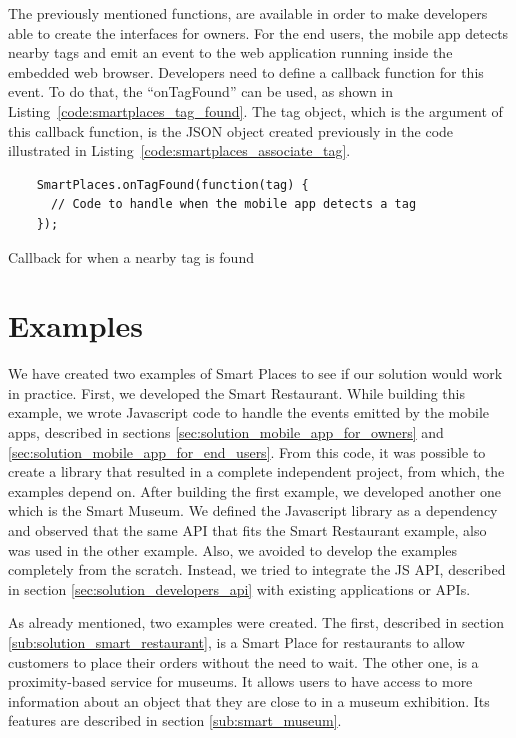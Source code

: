 The previously mentioned functions, are available in order to make developers able to create the interfaces for owners.
For the end users, the mobile app detects nearby tags and emit an event to the web application running inside the embedded web browser.
Developers need to define a callback function for this event.
To do that, the ``onTagFound'' can be used, as shown in Listing~\ref{code:smartplaces_tag_found}.
The tag object, which is the argument of this callback function, is the \gls{JSON} object created previously in the code illustrated in Listing~\ref{code:smartplaces_associate_tag}.

\begin{listing}[H]
  \begin{verbatim}
    SmartPlaces.onTagFound(function(tag) {
      // Code to handle when the mobile app detects a tag
    });
  \end{verbatim}
  \caption[Defining a callback for when a tag is found]{Callback for when a nearby tag is found}
  \label{code:smartplaces_tag_found}
\end{listing}

\section{Examples}
\label{sec:solution_examples}
We have created two examples of Smart Places to see if our solution would work in practice.
First, we developed the Smart Restaurant.
While building this example, we wrote Javascript code to handle the events emitted by the mobile apps, described in sections \ref{sec:solution_mobile_app_for_owners} and \ref{sec:solution_mobile_app_for_end_users}.
From this code, it was possible to create a library that resulted in a complete independent project, from which, the examples depend on.
After building the first example, we developed another one which is the Smart Museum.
We defined the Javascript library as a dependency and observed that the same \gls{API} that fits the Smart Restaurant example, also was used in the other example.
Also, we avoided to develop the examples completely from the scratch.
Instead, we tried to integrate the \gls{JS} \gls{API}, described in section \ref{sec:solution_developers_api} with existing applications or \glspl{API}.

As already mentioned, two examples were created.
The first, described in section \ref{sub:solution_smart_restaurant}, is a Smart Place for restaurants to allow customers to place their orders without the need to wait.
The other one, is a proximity-based service for museums.
It allows users to have access to more information about an object that they are close to in a museum exhibition.
Its features are described in section \ref{sub:smart_museum}.

